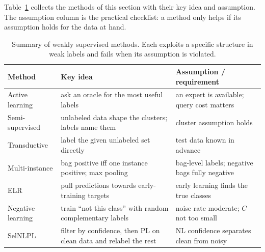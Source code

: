 \noindent
Table~\ref{tab:weak-summary} collects the methods of this section with
their key idea and assumption. The assumption column is the practical
checklist: a method only helps if its assumption holds for the data at hand.

\begin{table}[ht]
  \centering
  \begin{tabular}{@{}p{3.7cm}p{5.2cm}p{4.9cm}@{}}
    \toprule
    Method & Key idea & Assumption / requirement \\
    \midrule
    Active learning & ask an oracle for the most useful labels & an expert is
      available; query cost matters \\
    Semi-supervised & unlabeled data shape the clusters; labels
      name them & cluster assumption holds \\
    Transductive & label the given unlabeled set directly & test data
      known in advance \\
    Multi-instance & bag positive iff one instance positive; max
      pooling & bag-level labels; negative bags fully negative \\
    ELR & pull predictions towards early-training targets &
      early learning finds the true classes \\
    Negative learning & train ``not this class'' with random complementary
      labels & noise rate moderate; $C$ not too small \\
    SelNLPL & filter by confidence, then PL on clean data and
      relabel the rest & NL confidence separates clean from noisy \\
    \bottomrule
  \end{tabular}
  \caption{Summary of weakly supervised methods. Each exploits a specific
  structure in weak labels and fails when its assumption is violated.}
  \label{tab:weak-summary}
\end{table}
